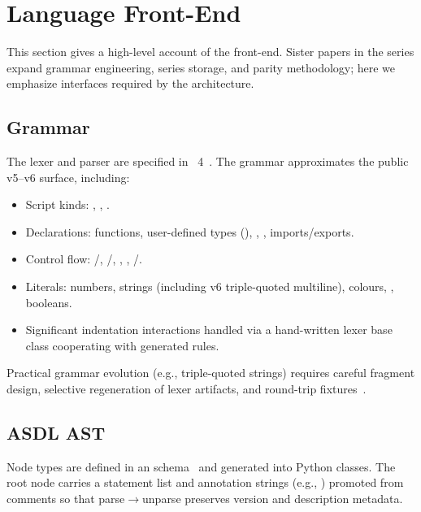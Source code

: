 \documentclass[11pt,a4paper]{article}
\begin{document}
\section{Language Front-End}
\label{sec:frontend}

This section gives a high-level account of the front-end.
Sister papers in the series expand grammar engineering, series storage, and
parity methodology; here we emphasize interfaces required by the architecture.

\subsection{Grammar}
\label{sec:grammar}

The lexer and parser are specified in \antlr{}~4~\citep{parr2013antlr,parr2011allstar,antlr4}.
The grammar approximates the public \pine{} v5--v6 surface, including:

\begin{itemize}[leftmargin=1.2em]
  \item Script kinds: , , .
  \item Declarations: functions,  user-defined types (\udt{}),
    , , imports/exports.
  \item Control flow: /, /,
    , , /.
  \item Literals: numbers, strings (including v6 triple-quoted multiline),
    colours, , booleans.
  \item Significant indentation interactions handled via a hand-written lexer
    base class cooperating with generated rules.
\end{itemize}

Practical grammar evolution (e.g., triple-quoted strings) requires careful
fragment design, selective regeneration of lexer artifacts, and round-trip
fixtures~\citep{pynescript2026}.

\subsection{ASDL AST}
\label{sec:asdl}

Node types are defined in an \asdl{} schema~\citep{wang1997asdl,asdl-python}
and generated into Python classes.
The root  node carries a statement list and annotation strings
(e.g., ) promoted from comments so that parse$\to$unparse
preserves version and description metadata.
\end{document}
